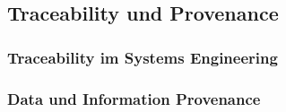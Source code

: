 %
%
%
%
%
%
%
%


\subsection{Traceability und Provenance}
\label{sec:traceability_provenance_foundation}

\subsubsection{Traceability im Systems Engineering}
\label{sec:traceability_foundation}

%
%
%
%
%
%
%


\subsubsection{Data und Information Provenance}
\label{sec:provenance_foundation}

